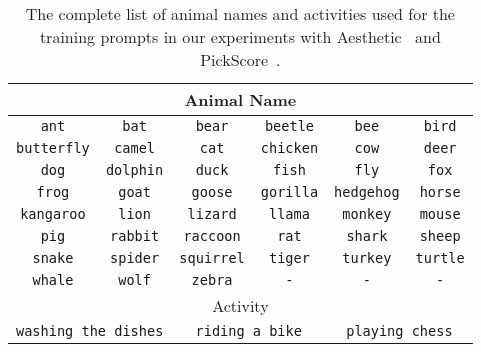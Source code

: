 \setlength{\tabcolsep}{17pt}
\renewcommand{\arraystretch}{2.0} 
\begin{table*}[ht]
\begin{center}
\caption{The complete list of animal names and activities used for the training prompts in our experiments with Aesthetic~\cite{aesthetic} and PickScore~\cite{pickscore}.}
\label{table:seen_prompt}
\begin{tabular}{cccccc}
\hline
\multicolumn{6}{c}{Animal Name} \\ \hline
\multicolumn{1}{c|}{\texttt{ant}} & \multicolumn{1}{c|}{\texttt{bat}} & \multicolumn{1}{c|}{\texttt{bear}} & \multicolumn{1}{c|}{\texttt{beetle}} & \multicolumn{1}{c|}{\texttt{bee}} & \texttt{bird} \\
\multicolumn{1}{c|}{\texttt{butterfly}} & \multicolumn{1}{c|}{\texttt{camel}} & \multicolumn{1}{c|}{\texttt{cat}} & \multicolumn{1}{c|}{\texttt{chicken}} & \multicolumn{1}{c|}{\texttt{cow}} & \texttt{deer} \\
\multicolumn{1}{c|}{\texttt{dog}} & \multicolumn{1}{c|}{\texttt{dolphin}} & \multicolumn{1}{c|}{\texttt{duck}} & \multicolumn{1}{c|}{\texttt{fish}} & \multicolumn{1}{c|}{\texttt{fly}} & \texttt{fox} \\
\multicolumn{1}{c|}{\texttt{frog}} & \multicolumn{1}{c|}{\texttt{goat}} & \multicolumn{1}{c|}{\texttt{goose}} & \multicolumn{1}{c|}{\texttt{gorilla}} & \multicolumn{1}{c|}{\texttt{hedgehog}} & \texttt{horse} \\
\multicolumn{1}{c|}{\texttt{kangaroo}} & \multicolumn{1}{c|}{\texttt{lion}} & \multicolumn{1}{c|}{\texttt{lizard}} & \multicolumn{1}{c|}{\texttt{llama}} & \multicolumn{1}{c|}{\texttt{monkey}} & \texttt{mouse} \\
\multicolumn{1}{c|}{\texttt{pig}} & \multicolumn{1}{c|}{\texttt{rabbit}} & \multicolumn{1}{c|}{\texttt{raccoon}} & \multicolumn{1}{c|}{\texttt{rat}} & \multicolumn{1}{c|}{\texttt{shark}} & \texttt{sheep} \\
\multicolumn{1}{c|}{\texttt{snake}} & \multicolumn{1}{c|}{\texttt{spider}} & \multicolumn{1}{c|}{\texttt{squirrel}} & \multicolumn{1}{c|}{\texttt{tiger}} & \multicolumn{1}{c|}{\texttt{turkey}} & \texttt{turtle} \\
\multicolumn{1}{c|}{\texttt{whale}} & \multicolumn{1}{c|}{\texttt{wolf}} & \multicolumn{1}{c|}{\texttt{zebra}} & \multicolumn{1}{c|}{\texttt{-}} & \multicolumn{1}{c|}{\texttt{-}} & \texttt{-} \\ \hline
\multicolumn{6}{c}{Activity} \\ \hline
\multicolumn{2}{c|}{\texttt{washing the dishes}} & \multicolumn{2}{c|}{\texttt{riding a bike}} & \multicolumn{2}{c}{\texttt{playing chess}}  
\vspace{-14em}
\end{tabular}

\end{center}
\end{table*}


